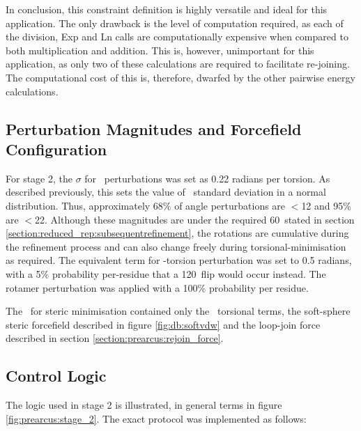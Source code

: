 In conclusion, this constraint definition is highly versatile and ideal for this application. The only drawback is the level of computation required, as each of the division, Exp and Ln calls are  computationally expensive when compared to both multiplication and addition. This is, however, unimportant for this application, as only two of these calculations are required to facilitate re-joining. The computational cost of this is, therefore, dwarfed by the other pairwise energy calculations.

\subsection{Perturbation Magnitudes and Forcefield Configuration}

For stage 2, the $\sigma$ for
\mainchain\ perturbations was set as 0.22 radians per torsion.
As described previously, this sets the  value of \first\ standard deviation in a normal distribution. Thus, approximately 68\% of angle perturbations are \mbox{$<$12\degree} and 95\% are \mbox{$<$22\degree}.
Although these magnitudes are under the required 60\degree\ stated in section \ref{section:reduced_rep:subsequentrefinement}, the rotations are cumulative during the refinement process and can also change freely during torsional-minimisation as required. The equivalent term for \Chi-torsion perturbation was set to 0.5 radians, with a 5\% probability per-residue that a 120\degree\ flip would occur instead.
The rotamer perturbation was applied with a 100\% probability per residue.

The \forcefield\  for steric minimisation contained only the \amberff\ torsional terms, the soft-sphere steric forcefield described in figure \ref{fig:db:softvdw} and the loop-join force described in section \ref{section:prearcus:rejoin_force}.

\subsection{Control Logic}

The logic used in stage 2 is illustrated, in general terms in figure \ref{fig:prearcus:stage_2}. The exact protocol  was implemented as follows:

